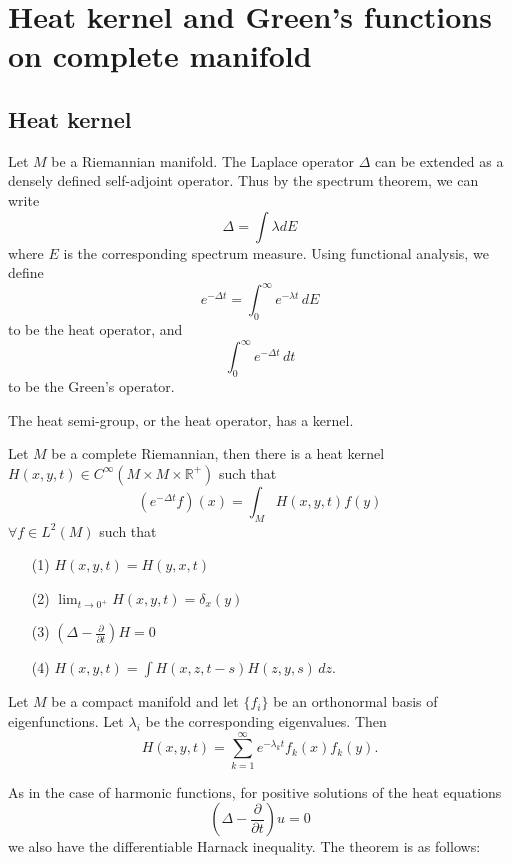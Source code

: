 
\chapter{Heat kernel and Green's functions on complete manifold}
\section{Heat kernel}
Let $M$ be a Riemannian manifold. The Laplace operator $ \Delta $ can be extended as a densely defined 
self-adjoint operator. Thus by the spectrum theorem, we can write
%
\[ \Delta = \int \lambda d E\]
%
where $ E$ is the corresponding spectrum measure. Using functional analysis, we define 
%
\[ e ^{- \Delta t} = \int ^\infty _0 e ^{- \lambda t } \, dE\]
%
to be the heat operator, and 
\[\int^\infty _ 0 e ^{-\Delta t} \, dt \]
%  
to be the Green's operator.

The heat semi-group, or the heat operator, has a kernel.

\begin{theorem} Let $M$ be a complete Riemannian, then there is a heat kernel $ H (x, y, t) \in C^\infty (M \times M \times \mathbb{R} ^+ )$ such that 
%
\[ (e ^{- \Delta t} f) (x) = \int_M  H (x, y, t )f (y) \]
%
$ \forall f \in L^2 (M) $ such that 
%
\begin{enumerate}
\item    [{\rm (1)}]  $H(x, y, t) = H (y, x, t)$  
\item   [{\rm (2)}]  $ \lim_{t \rightarrow 0^{+} } H (x, y, t) = \delta _x (y)$
\item   [{\rm (3)}]  $ \left( \Delta - \frac{\partial }{\partial t} \right) H = 0$
\item   [{\rm (4)}]  $ H(x, y, t) =  \int H (x, z, t - s) H (z, y, s) \, dz.$
\end{enumerate}
\end{theorem}

\begin{remark}
Let $M$ be a compact manifold and let $ \{ f_i\} $ be an orthonormal basis of eigenfunctions. Let $ \lambda _i $ be the corresponding eigenvalues. Then
%
\[ H(x, y, t) = \sum^\infty_{k=1} e ^{-\lambda _{k} t} f _k (x) f_k  (y) .\]

As in the case of harmonic functions, for positive solutions of the heat equations
%
\[ \left( \Delta - \frac{\partial }{\partial t} \right) u= 0\]
%
we also have the differentiable Harnack inequality. The  theorem is as follows:
\end{remark}

